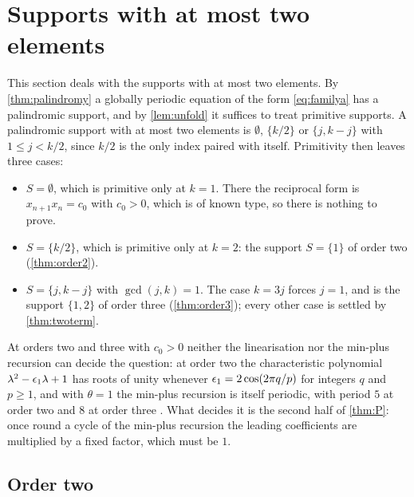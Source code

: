 \section{Supports with at most two elements}
\label{sec:small}

This section deals with the supports with at most two elements. By
\autoref{thm:palindromy} a globally periodic equation of the form
\eqref{eq:familya} has a palindromic support, and by \autoref{lem:unfold} it
suffices to treat primitive supports. A palindromic support with at most two
elements is $\emptyset$, $\{k/2\}$ or $\{j,k-j\}$ with $1\le j<k/2$, since
$k/2$ is the only index paired with itself. Primitivity then leaves three
cases:
\begin{itemize}
\item $S=\emptyset$, which is primitive only at $k=1$. There the reciprocal
form is $x_{n+1}x_n=c_0$ with $c_0>0$, which is of known type, so there is
nothing to prove.
\item $S=\{k/2\}$, which is primitive only at $k=2$: the support $S=\{1\}$
of order two (\autoref{thm:order2}).
\item $S=\{j,k-j\}$ with $\gcd(j,k)=1$. The case $k=3j$ forces $j=1$, and
is the support $\{1,2\}$ of order three (\autoref{thm:order3}); every other
case is settled by \autoref{thm:twoterm}.
\end{itemize}

At orders two and three with $c_0>0$ neither the linearisation nor the
min-plus recursion can decide the question: at order two the characteristic
polynomial $\lambda^2-\epsilon_1\lambda+1$ has roots of unity whenever
$\epsilon_1=2\cos(2\pi q/p)$ for integers $q$ and $p\ge1$, and with $\theta=1$ the min-plus recursion is itself
periodic, with period $5$ at order two and $8$ at order three
\citep[Theorem~9]{CsornyeiLaczkovich2001}. What decides it is the second half
of \autoref{thm:P}: once round a cycle of the min-plus recursion the leading
coefficients are multiplied by a fixed factor, which must be $1$.

\subsection{Order two}


